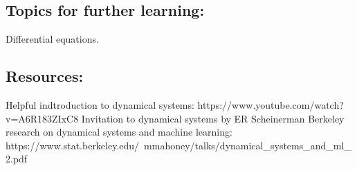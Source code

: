 \documentclass{article}
\begin{document}
\subsection{Topics for further learning:}
Differential equations.

\subsection{Resources:}
Helpful indtroduction to dynamical systems: https://www.youtube.com/watch?v=A6R183ZIxC8
Invitation to dynamical systems by ER Scheinerman
Berkeley research on dynamical systems and machine learning: https://www.stat.berkeley.edu/~mmahoney/talks/dynamical_systems_and_ml_2.pdf
\end{document}

